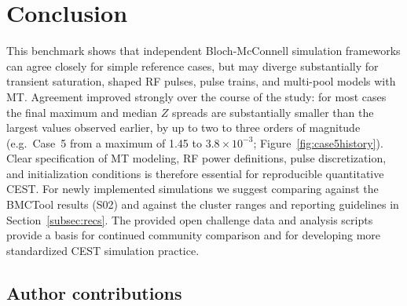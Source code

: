 \documentclass[11pt,a4paper]{article}
\begin{document}
\section{Conclusion}\label{Conc}
This benchmark shows that independent Bloch-McConnell simulation frameworks can agree closely for simple reference cases, but may diverge substantially for transient saturation, shaped RF pulses, pulse trains, and multi-pool models with MT.
Agreement improved strongly over the course of the study: for most cases the final maximum and median $Z$ spreads are substantially smaller than the largest values observed earlier, by up to two to three orders of magnitude (e.g.\ Case~5 from a maximum of 1.45 to $3.8\times10^{-3}$; Figure~\ref{fig:case5history}).
Clear specification of MT modeling, RF power definitions, pulse discretization, and initialization conditions is therefore essential for reproducible quantitative CEST.
For newly implemented simulations we suggest comparing against the BMCTool results (S02)  and against the cluster ranges and reporting guidelines in Section~\ref{subsec:recs}.
The provided open challenge data and analysis scripts provide a basis for continued community comparison and for developing more standardized CEST simulation practice. 


\subsection*{Author contributions}
\end{document}

